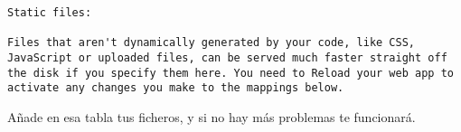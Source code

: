 \begin{itemize}
  \begin{verbatim}
Static files:

Files that aren't dynamically generated by your code, like CSS, JavaScript or uploaded files, can be served much faster straight off the disk if you specify them here. You need to Reload your web app to activate any changes you make to the mappings below.
\end{verbatim}

  Añade en esa tabla tus ficheros, y si no hay más problemas te funcionará.

\end{itemize}

